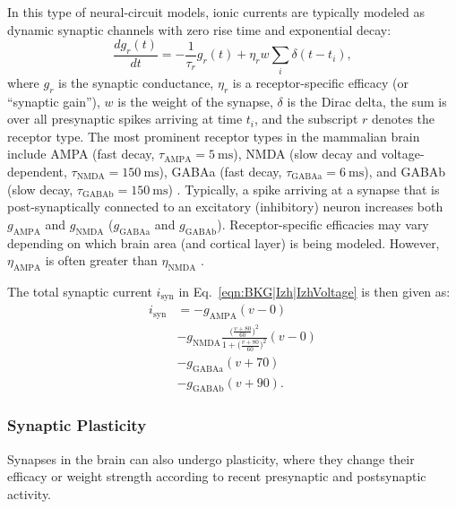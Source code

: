 In this type of neural-circuit models, ionic currents are typically
modeled as dynamic synaptic channels with zero rise time
and exponential decay:
\begin{equation}
\frac{dg_r(t)}{dt} = -\frac{1}{\tau_r} g_r(t) + \eta_r w
	\sum_i \delta(t-t_i),
\label{eqn:BKG|Izh|current}
\end{equation}
where $g_r$ is the synaptic conductance,
$\eta_r$ is a receptor-specific efficacy (or ``synaptic gain''),
$w$ is the weight of the synapse,
$\delta$ is the Dirac delta, 
the sum is over all presynaptic spikes arriving at time $t_i$,
and the subscript $r$ denotes the receptor type.
The most prominent receptor types in the mammalian brain include
AMPA (fast decay, $\tau_{\textrm{AMPA}} = \SI{5}{\milli\second}$), 
NMDA (slow decay and voltage-dependent, 
$\tau_{\textrm{NMDA}} = \SI{150}{\milli\second}$), 
GABAa (fast decay, 
$\tau_{\textrm{GABAa}} = \SI{6}{\milli\second}$),
and  GABAb (slow decay, 
$\tau_{\textrm{GABAb}} = \SI{150}{\milli\second}$)
\citep{Izhikevich2004b}.
Typically, a spike arriving at a synapse that is post-synaptically
connected to an excitatory (inhibitory) neuron increases both
$g_{\textrm{AMPA}}$ and $g_{\textrm{NMDA}}$ 
($g_{\textrm{GABAa}}$ and $g_{\textrm{GABAb}}$).
Receptor-specific efficacies may vary depending on which brain area
(and cortical layer) is being modeled. 
However, $\eta_{\textrm{AMPA}}$ is often greater than
$\eta_{\textrm{NMDA}}$ \citep{Myme2003}.

The total synaptic current $i_{\textrm{syn}}$ in
Eq.~\ref{eqn:BKG|Izh|IzhVoltage} is then given as:
\begin{align}
i_{\textrm{syn}} & = - g_{\textrm{AMPA}}(v-0) \nonumber \\
	& - g_{
    	\textrm{NMDA}} \frac{ \big( \frac{v+80}{60} \big)^2
    }{
    	1 + \big( \frac{v+80}{60} \big)^2
    } (v-0) \nonumber \\
    & -  g_{\textrm{GABAa}}(v+70) \nonumber \\
    & -  g_{\textrm{GABAb}}(v+90).
\label{eqn:BKG|Izh|receptors}
\end{align}


\subsubsection{Synaptic Plasticity}
\label{sec:BKG|plasticity}

Synapses in the brain can also undergo plasticity, 
where they change their efficacy or weight strength 
according to recent presynaptic and postsynaptic activity.

